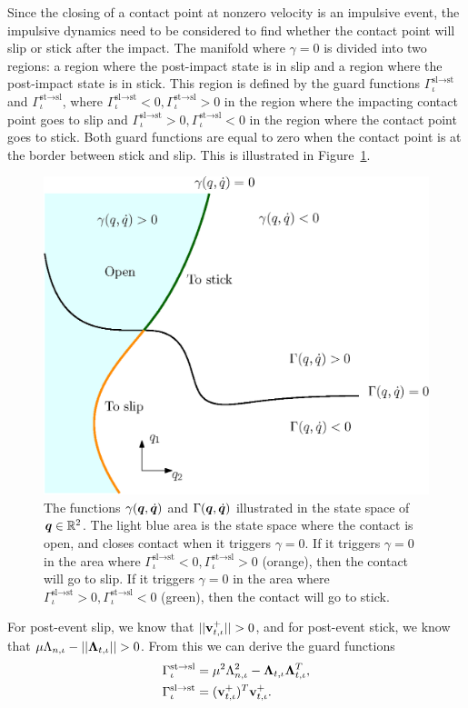 \documentclass[../DC2017114Bouma.tex]{subfiles}
\begin{document}
Since the closing of a contact point at nonzero velocity is an impulsive event, the impulsive dynamics need to be considered to find whether the contact point will slip or stick after the impact. The manifold where $\gamma = 0$ is divided into two regions: a region where the post-impact state is in slip and a region where the post-impact state is in stick. This region is defined by the guard functions $\Gamma^{\text{sl}\rightarrow\text{st}}_{\iota}$ and $\Gamma^{\text{st}\rightarrow\text{sl}}_{\iota}$, where $\Gamma^{\text{sl}\rightarrow\text{st}}_{\iota}<0,\Gamma^{\text{st}\rightarrow\text{sl}}_{\iota}>0$ in the region where the impacting contact point goes to slip and $\Gamma^{\text{sl}\rightarrow\text{st}}_{\iota}>0,\Gamma^{\text{st}\rightarrow\text{sl}}_{\iota}<0$ in the region where the contact point goes to stick. Both guard functions are equal to zero when the contact point is at the border between stick and slip. This is illustrated in Figure~\ref{fig:guardopcl}. 
\begin{figure}[bt!]
	\centering
	\includegraphics[width=.7\textwidth]{guardopcl.eps}\caption{The functions $\gamma({\boldsymbol{q}},\dot{{\boldsymbol{q}}})$ and $\Gamma({\boldsymbol{q}},\dot{{\boldsymbol{q}}})$ illustrated in the state space of ${\boldsymbol{q}}\in\mathbb{R}^{2}$. The light blue area is the state space where the contact is open, and closes contact when it triggers $\gamma = 0$. If it triggers $\gamma = 0$ in the area where $\Gamma^{\text{sl}\rightarrow\text{st}}_{\iota}<0,\Gamma^{\text{st}\rightarrow\text{sl}}_{\iota}>0$ (orange), then the contact will go to slip. If it triggers $\gamma=0$ in the area where $\Gamma^{\text{sl}\rightarrow\text{st}}_{\iota}>0,\Gamma^{\text{st}\rightarrow\text{sl}}_{\iota}<0$ (green), then the contact will go to stick.}\label{fig:guardopcl}
\end{figure}
For post-event slip, we know that $||\mathbf{v}^+_{t,\iota}|| > 0$, and for post-event stick, we know that  $\mu\Lambda_{n,\iota} - ||\boldsymbol{\Lambda}_{t,\iota}|| > 0$. From this we can derive the guard functions
\begin{align}
\Gamma^{\text{st}\rightarrow\text{sl}}_{\iota} &= \mu^2\Lambda_{n,\iota}^2 - \boldsymbol{\Lambda}_{t,\iota}\boldsymbol{\Lambda}_{t,\iota}^T,\label{eq:slipstick1}\\
\Gamma^{\text{sl}\rightarrow\text{st}}_{\iota} &= (\mathbf{v}^+_{t,\iota})^T\mathbf{v}^+_{t,\iota}.\label{eq:slipstick2}
\end{align}
\end{document}
